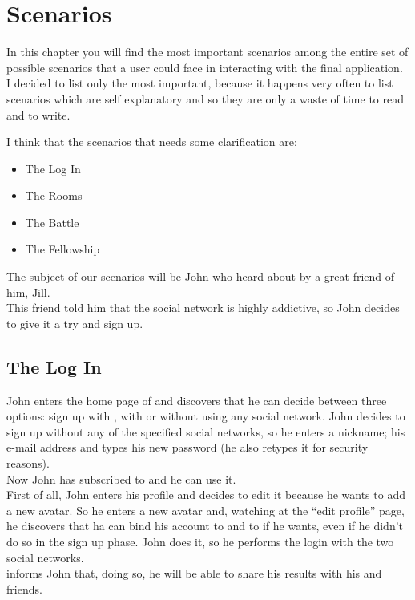 \chapter{Scenarios}
	In this chapter you will find the most important scenarios among the entire set of possible scenarios that a user could face in interacting with the final application.\\
	I decided to list only the most important, because it happens very often to list scenarios which are self explanatory and so they are only a waste of time to read and to write.

	I think that the scenarios that needs some clarification are:
	\newcommand{\scenarioLogin}{The Log In}
	\newcommand{\scenarioRooms}{The Rooms}
	\newcommand{\scenarioBattle}{The Battle}
	\newcommand{\scenarioFellowship}{The Fellowship}
	\begin{itemize}
		\item \scenarioLogin 
		\item \scenarioRooms 
		\item \scenarioBattle 
		\item \scenarioFellowship
	\end{itemize}

	The subject of our scenarios will be John who heard about \SocialBattle{} by a great friend of him, Jill.\\
	This friend told him that the social network is highly addictive, so John decides to give it a try and sign up.

	\section{\scenarioLogin}
		John enters the home page of \SocialBattle{} and discovers that he can decide between three options:
		sign up with \Facebook, with \Twitter or without using any social network.
		John decides to sign up without any of the specified social networks, so he enters a nickname; his e-mail address and types his new password (he also retypes it for security reasons).\\
		Now John has subscribed to \SocialBattle{} and he can use it.\\
		First of all, John enters his profile and decides to edit it because he wants to add a new avatar. So he enters a new avatar and, watching at the ``edit profile'' page, he discovers that ha can bind his account to \Facebook{} and to \Twitter{} if he wants, even if he didn't do so in the sign up phase. John does it, so he performs the login with the two social networks.\\
		\SocialBattle{} informs John that, doing so, he will be able to share his results with his \Facebook{} and \Twitter{} friends.


